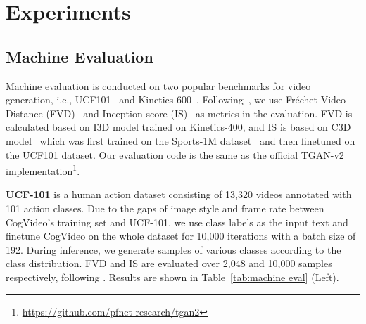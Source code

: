 \section{Experiments} \label{sec-experiment}



\subsection{Machine Evaluation}
Machine evaluation is conducted on two popular benchmarks for video generation, i.e., UCF101~\cite{soomro2012ucf101} and Kinetics-600~\cite{carreira2018short}. Following~\citet{rakhimov2020latent,yu2022generating}, we use 
Fréchet Video Distance (FVD)~\cite{unterthiner2018towards} and Inception score (IS)~\cite{salimans2016improved} as metrics in the evaluation. FVD is calculated based on I3D model\cite{carreira2017quo} trained on Kinetics-400, and IS is based on C3D model~\cite{tran2015learning} which was first trained on the Sports-1M dataset~\cite{karpathy2014large} and then finetuned on the UCF101 dataset. Our evaluation code is the same as the official TGAN-v2 implementation\footnote{\url{https://github.com/pfnet-research/tgan2}}. 

\textbf{UCF-101} is a human action dataset consisting of 13,320 videos 
annotated 
with 101 action classes. Due to the gaps of image style and frame rate between CogVideo's training set and UCF-101, we use class labels as the input text and finetune CogVideo on the whole dataset for 10,000 iterations with a batch size of 192. During inference, we generate samples of various classes according to the class distribution.
FVD and IS are evaluated over 2,048 and 10,000 samples respectively, following \citet{yu2022generating}. Results are shown in Table~\ref{tab:machine eval} (Left). 


